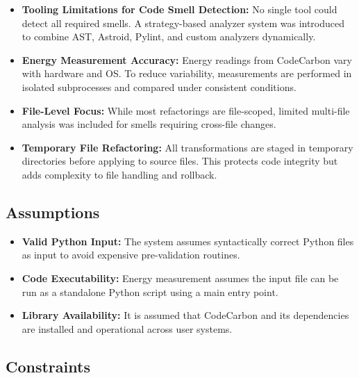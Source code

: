 \documentclass{article}
\begin{document}
\begin{itemize}
    \item \textbf{Tooling Limitations for Code Smell Detection:} No single tool could detect all required smells. A strategy-based analyzer system was introduced to combine AST, Astroid, Pylint, and custom analyzers dynamically.
    
    \item \textbf{Energy Measurement Accuracy:} Energy readings from CodeCarbon vary with hardware and OS. To reduce variability, measurements are performed in isolated subprocesses and compared under consistent conditions.
    
    \item \textbf{File-Level Focus:} While most refactorings are file-scoped, limited multi-file analysis was included for smells requiring cross-file changes. 
    
    \item \textbf{Temporary File Refactoring:} All transformations are staged in temporary directories before applying to source files. This protects code integrity but adds complexity to file handling and rollback.
\end{itemize}

\subsection*{Assumptions}

\begin{itemize}
    \item \textbf{Valid Python Input:} The system assumes syntactically correct Python files as input to avoid expensive pre-validation routines.
    
    \item \textbf{Code Executability:} Energy measurement assumes the input file can be run as a standalone Python script using a main entry point.
    
    \item \textbf{Library Availability:} It is assumed that CodeCarbon and its dependencies are installed and operational across user systems.
\end{itemize}

\subsection*{Constraints}
\end{document}
